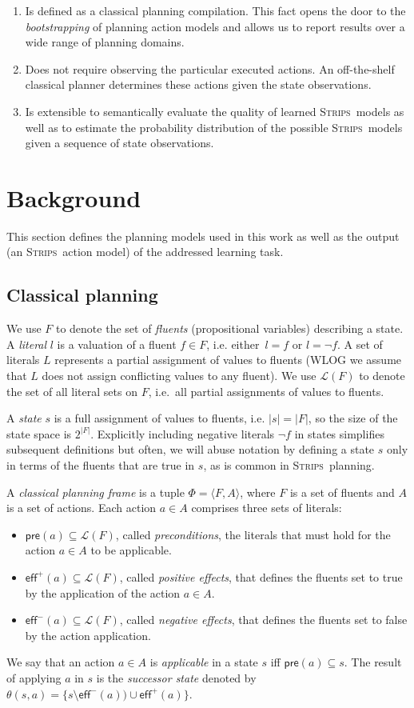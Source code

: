 \documentclass{article}
\newcommand{\tup}[1]{{\langle #1 \rangle}}
\newcommand{\pre}{\mathsf{pre}}     %
\newcommand{\eff}{\mathsf{eff}}     %
\newcommand{\strips}{\textsc{Strips}}     %
\begin{document}
\begin{enumerate}
\item Is defined as a classical planning compilation. This fact opens the door to the {\em bootstrapping} of planning action models and allows us to report results over a wide range of planning domains.
\item Does not require observing the particular executed actions. An off-the-shelf classical planner determines these actions given the state observations.
\item Is extensible to semantically evaluate the quality of learned \strips\ models as well as to estimate the probability distribution of the possible \strips\ models given a sequence of state observations.
\end{enumerate}


\section{Background}
This section defines the planning models used in this work as well as the output (an \strips\ action model) of the addressed learning task.

\subsection{Classical planning}
We use $F$ to denote the set of {\em fluents} (propositional variables) describing a state. A {\em literal} $l$ is a valuation of a fluent $f\in F$, i.e. either~$l=f$ or $l=\neg f$. A set of literals $L$ represents a partial assignment of values to fluents (WLOG we assume that $L$ does not assign conflicting values to any fluent). We use $\mathcal{L}(F)$ to denote the set of all literal sets on $F$, i.e.~all partial assignments of values to fluents.

A {\em state} $s$ is a full assignment of values to fluents, i.e. $|s|=|F|$, so the size of the state space is $2^{|F|}$. Explicitly including negative literals $\neg f$ in states simplifies subsequent definitions but often, we will abuse notation by defining a state $s$ only in terms of the fluents that are true in $s$, as is common in \strips\ planning.

A {\em classical planning frame} is a tuple $\Phi=\tup{F,A}$, where $F$ is a set of fluents and $A$ is a set of actions. Each action $a\in A$ comprises three sets of literals:
\begin{itemize}
\item $\pre(a)\subseteq\mathcal{L}(F)$, called {\em preconditions}, the literals that must hold for the action $a\in A$ to be applicable.
\item $\eff^+(a)\subseteq\mathcal{L}(F)$, called {\em positive effects}, that defines the fluents set to true by the application of the action $a\in A$.
\item $\eff^-(a)\subseteq\mathcal{L}(F)$, called {\em negative effects}, that defines the fluents set to false by the action application.
\end{itemize}
We say that an action $a\in A$ is {\em applicable} in a state $s$ iff $\pre(a)\subseteq s$. The result of applying $a$ in $s$ is the {\em successor state} denoted by $\theta(s,a)=\{s\setminus\eff^-(a))\cup\eff^+(a)\}$.
\end{document}

